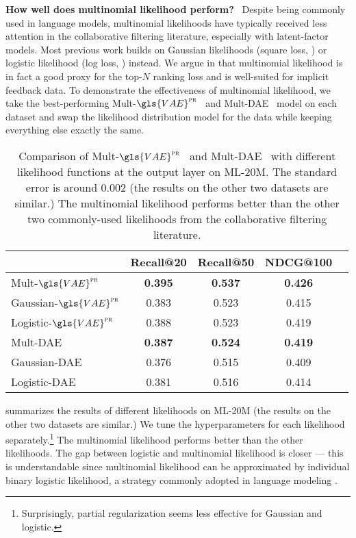 \documentclass[sigconf]{acmart}
\DeclareRobustCommand{\parhead}[1]{\textbf{#1}~}
\newcommand{\mvae}{{\small Mult-}$\gls{VAE}^{\text{\sc pr}}$}
\newcommand{\mdae}{{\small Mult-}\gls{DAE}}
\newcommand{\vae}[1]{{\small #1-}$\gls{VAE}^{\text{\sc pr}}$}
\newcommand{\dae}[1]{{\small #1-}\gls{DAE}}
\begin{document}
\parhead{How well does multinomial likelihood perform?} 
Despite being commonly used in language models, multinomial likelihoods have typically received less attention in the collaborative filtering literature, 
especially with latent-factor models. Most previous work builds on Gaussian likelihoods (square loss, ) \citep{hu2008collaborative,ning2011slim,wu2016collaborative} or logistic likelihood (log loss, ) \citep{wu2016collaborative,he2017neural} instead. 
We argue in  that multinomial likelihood is in fact a good proxy for the top-$N$ ranking loss and is well-suited for implicit feedback data. 
To demonstrate the effectiveness of multinomial likelihood, we take the best-performing \mvae~ and \mdae~ model on each dataset and swap the likelihood distribution model for the data while keeping everything else exactly the same. 

\begin{table}
\centering
\caption{Comparison of \mvae~ and \mdae~ with different likelihood functions at the output layer on ML-20M. The standard error is around 0.002 (the results on the other two datasets are similar.) The multinomial likelihood performs better than the other two commonly-used likelihoods from the collaborative filtering literature. }
\begin{tabular}{ l c c c c }
  & Recall@20 & Recall@50 & NDCG@100  \\
  \toprule
  \vae{Mult} & \bf 0.395 & \bf 0.537 & \bf 0.426 \\
  \vae{Gaussian}  & 0.383 & 0.523 & 0.415 \\
  \vae{Logistic}  & 0.388 & 0.523 & 0.419 \\
  \midrule
  \dae{Mult} & \bf 0.387 & \bf 0.524 & \bf 0.419 \\
  \dae{Gaussian} & 0.376 & 0.515 & 0.409 \\
  \dae{Logistic} & 0.381 & 0.516 & 0.414 \\
  \bottomrule
\end{tabular}
\label{tab:multi_vs_others}
\end{table}

 summarizes the results of different likelihoods on ML-20M (the results on the other two datasets are similar.) We tune the hyperparameters for each likelihood separately.\footnote{Surprisingly, partial regularization seems less effective for Gaussian and logistic.} The multinomial likelihood performs better than the other likelihoods. The gap between logistic and multinomial likelihood is closer --- this is understandable since multinomial likelihood can be approximated by individual binary logistic likelihood, a strategy commonly adopted in language modeling \citep{mikolov2013distributed,xu2011efficient}.
\end{document}
